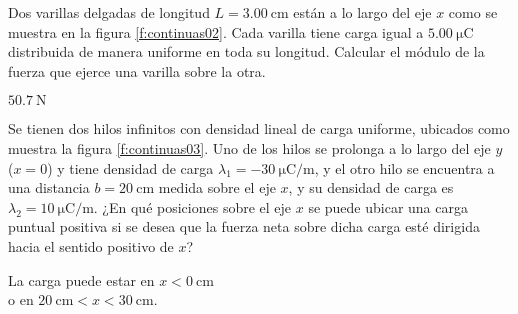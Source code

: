 %
\begin{Exercise}\label{p:continuas02}
  \textbf{\raisebox{.5pt}{\textcircled{\raisebox{-1.2pt} {E}}}} Dos varillas delgadas de longitud $L = \SI{3.00}{\centi\metre}$ están a lo largo del eje $x$ como se muestra en la figura \ref{f:continuas02}. Cada varilla tiene carga igual a $\SI{5.00}{\micro\coulomb}$ distribuida de manera uniforme en toda su longitud. Calcular el módulo de la fuerza que ejerce una varilla sobre la otra.
\end{Exercise}
\begin{Answer}
  $\SI{50.7}{\newton}$
\end{Answer}
%
\begin{center}
\end{center}
%
\begin{Exercise}\label{p:continuas03}
Se tienen dos hilos infinitos con densidad lineal de carga uniforme, ubicados como muestra la figura \ref{f:continuas03}. Uno de los hilos se prolonga a lo largo del eje $y$ ($x=0$) y tiene densidad de carga $\lambda_1 = \SI{-30}{\micro\coulomb/\metre}$, y el otro hilo se encuentra a una distancia $b = \SI{20}{\centi\metre}$ medida sobre el eje $x$, y su densidad de carga es $\lambda_2 = \SI{10}{\micro\coulomb/\metre}$. ¿En qué posiciones sobre el eje $x$ se puede ubicar una carga puntual positiva si se desea que la fuerza neta sobre dicha carga esté dirigida hacia el sentido positivo de $x$?
\end{Exercise}
\begin{Answer}
  \begin{minipage}[t]{.4\textwidth}
  La carga puede estar en $ x < \SI{0}{\centi\metre}$ \\ o en $\SI{20}{\centi\metre} < x < \SI{30}{\centi\metre}.$
  \end{minipage}
\end{Answer}
